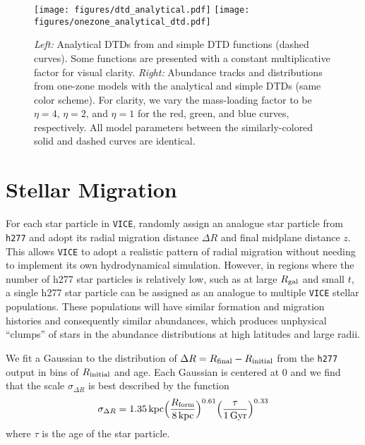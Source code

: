 \documentclass[twocolumn,twocolappendix,linenumbers,trackchanges]{aastex631}
\newcommand{\vice}{{\tt VICE}\xspace}
\begin{document}
\begin{figure*}
    \centering
    \texttt{[image: figures/dtd\_analytical.pdf]}
    \texttt{[image: figures/onezone\_analytical\_dtd.pdf]}
    \caption{\textit{Left:} Analytical DTDs from \citet[][solid curves]{Greggio2005-AnalyticalRates} and simple DTD functions (dashed curves). Some functions are presented with a constant multiplicative factor for visual clarity. \textit{Right:} Abundance tracks and distributions from one-zone models with the analytical and simple DTDs (same color scheme). For clarity, we vary the mass-loading factor to be $\eta=4$, $\eta=2$, and $\eta=1$ for the red, green, and blue curves, respectively. All model parameters between the similarly-colored solid and dashed curves are identical.}
    \label{fig:analytical-dtd}
\end{figure*}

\section{Stellar Migration}
\label{app:migration}

For each star particle in \vice,  randomly assign an analogue star particle from \texttt{h277} and adopt its radial migration distance $\Delta R$ and final midplane distance $z$. This allows \vice to adopt a realistic pattern of radial migration without needing to implement its own hydrodynamical simulation. However, in regions where the number of h277 star particles is relatively low, such as at large $R_{\rm gal}$ and small $t$, a single h277 star particle can be assigned as an analogue to multiple \vice stellar populations. These populations will have similar formation and migration histories and consequently similar abundances, which produces unphysical ``clumps'' of stars in the abundance distributions at high latitudes and large radii. 

We fit a Gaussian to the distribution of $\Delta R = R_{\rm final} - R_{\rm initial}$ from the \texttt{h277} output in bins of $R_{\rm initial}$ and age. Each Gaussian is centered at 0 and we find that the scale $\sigma_{\Delta R}$ is best described by the function
\begin{equation}
    \sigma_{\Delta R} = 1.35\,{\rm kpc} \Big(\frac{R_{\rm form}}{8\,{\rm kpc}}\Big)^{0.61} \Big(\frac{\tau}{1\,{\rm Gyr}}\Big)^{0.33}
    \label{eq:radial-migration}
\end{equation}
where $\tau$ is the age of the star particle. 
\end{document}
